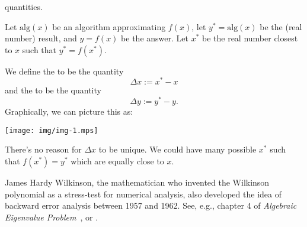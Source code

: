 quantities.
\begin{defn}
Let $\mathrm{alg}(x)$ be an algorithm approximating $f(x)$, let
$y^{*}=\mathrm{alg}(x)$ be the (real number) result, and $y=f(x)$ be the
answer. Let $x^{*}$ be the real number closest to $x$ such that
$y^{*}=f(x^{*})$.

We define the  to be the quantity
\begin{equation}
  \Delta x := x^{*} - x
\end{equation}
and the  to be the quantity
\begin{equation}
  \Delta y := y^{*} - y.
\end{equation}
Graphically, we can picture this as:
\begin{center}
  \texttt{[image: img/img-1.mps]}
\end{center}
\end{defn}
\begin{rmk}
  There's no reason for $\Delta x$ to be unique. We could have many
  possible $x^{*}$ such that $f(x^{*})=y^{*}$ which are equally close to
  $x$.
\end{rmk}
\begin{rmk}[History]
  James Hardy Wilkinson, the mathematician who invented the Wilkinson
  polynomial as a stress-test for numerical analysis, also developed the
  idea of backward error analysis between 1957 and 1962. See, e.g.,
  chapter 4 of
  \emph{Algebraic Eigenvalue Problem}~\cite{wilkinson1965}, or
  \cite[(\S6~\textit{et seq}.)]{wilkinson1963}.
\end{rmk}
